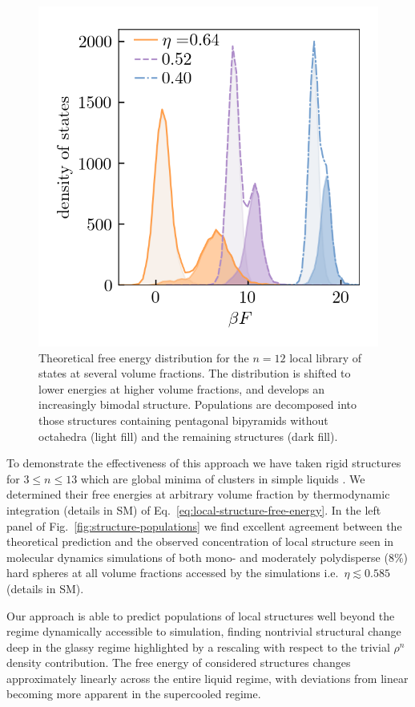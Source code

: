 \documentclass[11pt,twoside]{report}
\begin{document}
\begin{figure}
  \includegraphics[width=0.9\linewidth,outer]{n12-dos}
  \caption[Free energy distribution of 12 particle structures]{
    Theoretical free energy distribution for the $n=12$ local library of states at several volume fractions.
    The distribution is shifted to lower energies at higher volume fractions, and develops an increasingly bimodal structure.
    Populations are decomposed into those structures containing pentagonal bipyramids without octahedra (light fill) and the remaining structures (dark fill).
  }
  \label{fig:n12-dos}
\end{figure}

To demonstrate the effectiveness of this approach we have taken rigid structures for $3 \le n \le 13$ which are global minima of clusters in simple liquids \cite{Wales2004}.
We determined their free energies at arbitrary volume fraction by thermodynamic integration (details in SM) of Eq.\ \eqref{eq:local-structure-free-energy}.
In the left panel of Fig.\ \ref{fig:structure-populations} we find excellent agreement between the theoretical prediction and the observed concentration of local structure seen in molecular dynamics simulations of both mono- and moderately polydisperse (8\%) hard spheres at all volume fractions accessed by the simulations i.e.\ $\eta \lesssim 0.585$ (details in SM).

Our approach is able to predict populations of local structures well beyond the regime dynamically accessible to simulation, finding nontrivial structural change deep in the glassy regime highlighted by a rescaling with respect to the trivial $\rho^n$ density contribution.
The free energy of considered structures changes approximately linearly across the entire liquid regime, with deviations from linear becoming more apparent in the supercooled regime.
\end{document}

